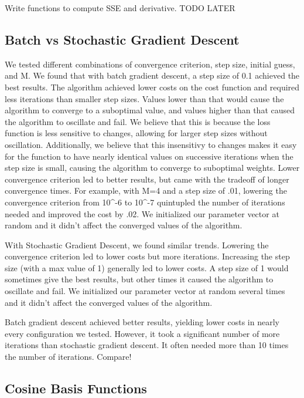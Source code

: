 \documentclass[a4paper,twoside]{article}
\begin{document}
Write functions to compute SSE and derivative. TODO LATER

\subsection{Batch vs Stochastic Gradient Descent}

We tested different combinations of convergence criterion, step size, initial guess, and M. We found that with batch gradient descent, a step size of 0.1 achieved the best results. The algorithm achieved lower costs on the cost function and required less iterations than smaller step sizes. Values lower than that would cause the algorithm to converge to a suboptimal value, and values higher than that caused the algorithm to oscillate and fail. We believe that this is because the loss function is less sensitive to changes, allowing for larger step sizes without oscillation. Additionally, we believe that this insensitivy to changes makes it easy for the function to have nearly identical values on successive iterations when the step size is small, causing the algorithm to converge to suboptimal weights. Lower convergence criterion led to better results, but came with the tradeoff of longer convergence times. For example, with M=4 and a step size of .01, lowering the convergence criterion from 10^-6 to 10^-7 quintupled the number of iterations needed and improved the cost by .02. We initialized our parameter vector at random and it didn't affect the converged values of the algorithm. 

With Stochastic Gradient Descent, we found similar trends. Lowering the convergence criterion led to lower costs but more iterations. Increasing the step size (with a max value of 1) generally led to lower costs. A step size of 1 would sometimes give the best results, but other times it caused the algorithm to oscillate and fail. We initialized our parameter vector at random several times and it didn't affect the converged values of the algorithm. 

Batch gradient descent achieved better results, yielding lower costs in nearly every configuration we tested. However, it took a significant number of more iterations than stochastic gradient descent. It often needed more than 10 times the number of iterations. 
Compare!

\subsection{Cosine Basis Functions}
\end{document}
